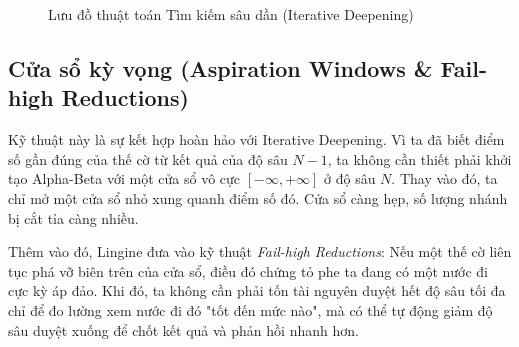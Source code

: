 \begin{figure}[htbp]
    \caption{Lưu đồ thuật toán Tìm kiếm sâu dần (Iterative Deepening)}
    \label{fig:iterative_deepening}
\end{figure}

\subsection{Cửa sổ kỳ vọng (Aspiration Windows \& Fail-high Reductions)}

Kỹ thuật này là sự kết hợp hoàn hảo với Iterative Deepening. Vì ta đã biết điểm số gần đúng của thế cờ từ kết quả của độ sâu $N-1$, ta không cần thiết phải khởi tạo Alpha-Beta với một cửa sổ vô cực $[-\infty, +\infty]$ ở độ sâu $N$. Thay vào đó, ta chỉ mở một cửa sổ nhỏ xung quanh điểm số đó. Cửa sổ càng hẹp, số lượng nhánh bị cắt tỉa càng nhiều. 

Thêm vào đó, Lingine đưa vào kỹ thuật \textit{Fail-high Reductions}: Nếu một thế cờ liên tục phá vỡ biên trên của cửa sổ, điều đó chứng tỏ phe ta đang có một nước đi cực kỳ áp đảo. Khi đó, ta không cần phải tốn tài nguyên duyệt hết độ sâu tối đa chỉ để đo lường xem nước đi đó "tốt đến mức nào", mà có thể tự động giảm độ sâu duyệt xuống để chốt kết quả và phản hồi nhanh hơn.

